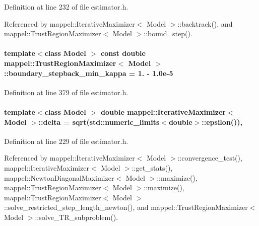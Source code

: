 Definition at line 232 of file estimator.\+h.



Referenced by mappel\+::\+Iterative\+Maximizer$<$ Model $>$\+::backtrack(), and mappel\+::\+Trust\+Region\+Maximizer$<$ Model $>$\+::bound\+\_\+step().

\paragraph[{\texorpdfstring{boundary\+\_\+stepback\+\_\+min\+\_\+kappa}{boundary_stepback_min_kappa}}]{\setlength{\rightskip}{0pt plus 5cm}template$<$class Model $>$ const double {\bf mappel\+::\+Trust\+Region\+Maximizer}$<$ Model $>$\+::boundary\+\_\+stepback\+\_\+min\+\_\+kappa = 1. -\/ 1.\+0e-\/5\hspace{0.3cm}{\ttfamily [static]}}\hypertarget{classmappel_1_1TrustRegionMaximizer_aa5b3ab917d1e7c661bfaad6b4e36c414}{}\label{classmappel_1_1TrustRegionMaximizer_aa5b3ab917d1e7c661bfaad6b4e36c414}


Definition at line 379 of file estimator.\+h.

\paragraph[{\texorpdfstring{delta}{delta}}]{\setlength{\rightskip}{0pt plus 5cm}template$<$class Model $>$ double {\bf mappel\+::\+Iterative\+Maximizer}$<$ Model $>$\+::delta = sqrt(std\+::numeric\+\_\+limits$<$double$>$\+::{\bf epsilon}())\hspace{0.3cm}{\ttfamily [protected]}, {\ttfamily [inherited]}}\hypertarget{classmappel_1_1IterativeMaximizer_a0aab5231009711a55325adbeb7d5f282}{}\label{classmappel_1_1IterativeMaximizer_a0aab5231009711a55325adbeb7d5f282}


Definition at line 229 of file estimator.\+h.



Referenced by mappel\+::\+Iterative\+Maximizer$<$ Model $>$\+::convergence\+\_\+test(), mappel\+::\+Iterative\+Maximizer$<$ Model $>$\+::get\+\_\+stats(), mappel\+::\+Newton\+Diagonal\+Maximizer$<$ Model $>$\+::maximize(), mappel\+::\+Trust\+Region\+Maximizer$<$ Model $>$\+::maximize(), mappel\+::\+Trust\+Region\+Maximizer$<$ Model $>$\+::solve\+\_\+restricted\+\_\+step\+\_\+length\+\_\+newton(), and mappel\+::\+Trust\+Region\+Maximizer$<$ Model $>$\+::solve\+\_\+\+T\+R\+\_\+subproblem().

